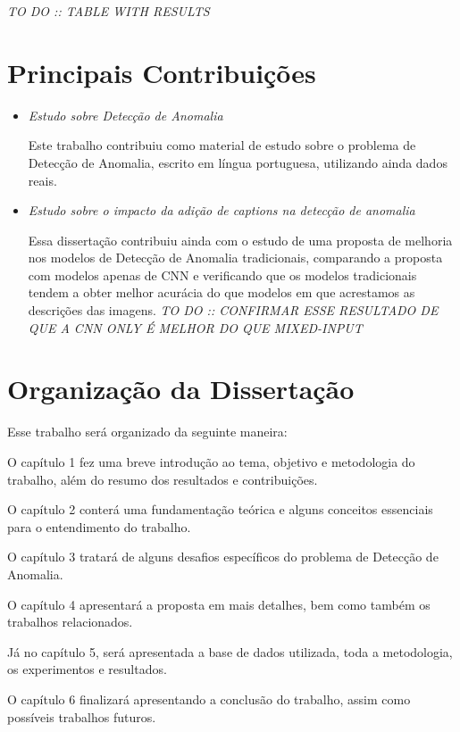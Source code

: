\textit{TO DO :: TABLE WITH RESULTS}

\section{Principais Contribuições}
\begin{itemize}
  \item \textit{Estudo sobre Detecção de Anomalia}
  
  Este trabalho contribuiu como material de estudo sobre o problema de Detecção de Anomalia, escrito em língua portuguesa, utilizando ainda dados reais.
  
  \item \textit{Estudo sobre o impacto da adição de captions na detecção de anomalia}

  Essa dissertação contribuiu ainda com o estudo de uma proposta  de melhoria nos modelos de Detecção de Anomalia tradicionais, comparando a proposta com modelos apenas de CNN e verificando que os modelos tradicionais tendem a obter melhor acurácia do que modelos em que acrestamos as descrições das imagens. \textit{TO DO :: CONFIRMAR ESSE RESULTADO DE QUE A CNN ONLY É MELHOR DO QUE MIXED-INPUT}
  
\end{itemize}

\section{Organização da Dissertação}

Esse trabalho será organizado da seguinte maneira:

O capítulo 1 fez uma breve introdução ao tema, objetivo e metodologia do trabalho, além do resumo dos resultados e contribuições.

O capítulo 2 conterá uma fundamentação teórica e alguns conceitos essenciais para o entendimento do trabalho.

O capítulo 3 tratará de alguns desafios específicos do problema de Detecção de Anomalia.

O capítulo 4 apresentará a proposta em mais detalhes, bem como também os trabalhos relacionados. 

Já no capítulo 5, será apresentada a base de dados utilizada, toda a metodologia, os experimentos e resultados.

O capítulo 6 finalizará apresentando a conclusão do trabalho, assim como possíveis trabalhos futuros.

